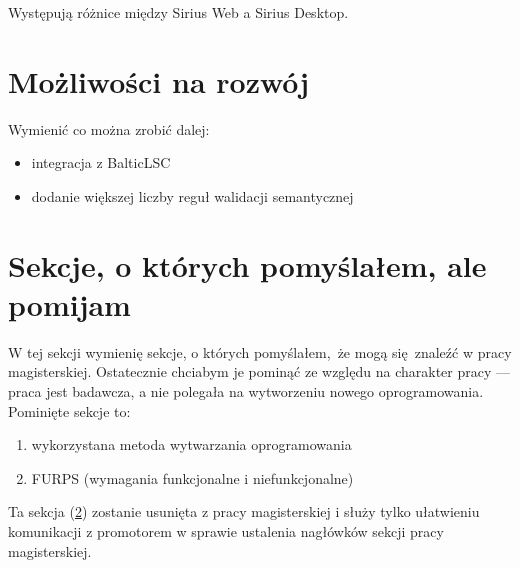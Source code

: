 Występują różnice między Sirius Web a Sirius Desktop.

\section{Możliwości na rozwój}

Wymienić co można zrobić dalej:

\begin{itemize}
	\item integracja z BalticLSC
	\item dodanie większej liczby reguł walidacji semantycznej
\end{itemize}

\section{Sekcje, o których pomyślałem, ale pomijam}\label{sec:pominiete-sekcje}

W tej sekcji wymienię sekcje, o których pomyślałem, że mogą się znaleźć w pracy
magisterskiej. Ostatecznie chciabym je pominąć ze względu na charakter pracy
--- praca jest badawcza, a nie polegała na wytworzeniu nowego oprogramowania.
Pominięte sekcje to:

\begin{enumerate}
	\item wykorzystana metoda wytwarzania oprogramowania
	\item FURPS (wymagania funkcjonalne i niefunkcjonalne)
\end{enumerate}

Ta sekcja (\ref{sec:pominiete-sekcje}) zostanie usunięta z pracy magisterskiej
i służy tylko ułatwieniu komunikacji z promotorem w sprawie ustalenia nagłówków
sekcji pracy magisterskiej.
